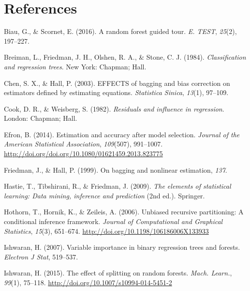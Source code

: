 \documentclass[12pt,twoside]{reedthesis}
\theoremstyle{definition}
\theoremstyle{definition}
\theoremstyle{definition}
\theoremstyle{remark}
\begin{document}
\backmatter

\chapter*{References}\label{references}


\noindent

\setlength{\parindent}{-0.20in} \setlength{\leftskip}{0.20in}
\setlength{\parskip}{8pt}

\hypertarget{refs}{}
\hypertarget{ref-biau2015a}{}
Biau, G., \& Scornet, E. (2016). A random forest guided tour. \emph{E.
TEST}, \emph{25}(2), 197--227.

\hypertarget{ref-breiman1984}{}
Breiman, L., Friedman, J. H., Olshen, R. A., \& Stone, C. J. (1984).
\emph{Classification and regression trees}. New York: Chapman; Hall.

\hypertarget{ref-chen2003}{}
Chen, S. X., \& Hall, P. (2003). EFFECTS of bagging and bias correction
on estimators defined by estimating equations. \emph{Statistica Sinica},
\emph{13}(1), 97--109.

\hypertarget{ref-cook1982}{}
Cook, D. R., \& Weisberg, S. (1982). \emph{Residuals and influence in
regression}. London: Chapman; Hall.

\hypertarget{ref-efron2014}{}
Efron, B. (2014). Estimation and accuracy after model selection.
\emph{Journal of the American Statistical Association}, \emph{109}(507),
991--1007. \url{http://doi.org/doi.org/10.1080/01621459.2013.823775}

\hypertarget{ref-hall1999}{}
Friedman, J., \& Hall, P. (1999). On bagging and nonlinear estimation,
\emph{137}.

\hypertarget{ref-esl2009}{}
Hastie, T., Tibshirani, R., \& Friedman, J. (2009). \emph{The elements
of statistical learning: Data mining, inference and prediction} (2nd
ed.). Springer.

\hypertarget{ref-hothorn2006}{}
Hothorn, T., Hornik, K., \& Zeileis, A. (2006). Unbiased recursive
partitioning: A conditional inference framework. \emph{Journal of
Computational and Graphical Statistics}, \emph{15}(3), 651--674.
\url{http://doi.org/10.1198/106186006X133933}

\hypertarget{ref-ishwaran2007}{}
Ishwaran, H. (2007). Variable importance in binary regression trees and
forests. \emph{Electron J Stat}, 519--537.

\hypertarget{ref-ishwaran2015}{}
Ishwaran, H. (2015). The effect of splitting on random forests.
\emph{Mach. Learn.}, \emph{99}(1), 75--118.
\url{http://doi.org/10.1007/s10994-014-5451-2}
\end{document}
